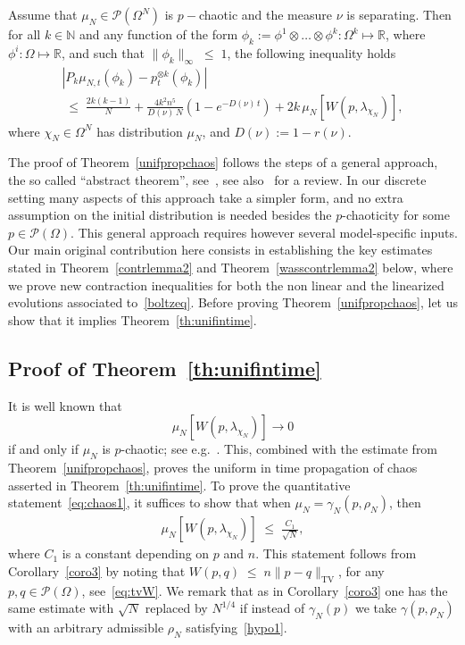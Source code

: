 \documentclass[AHL,Unicode,longabstracts,published]{cedram}
\renewcommand{\leq}{\;\leqslant\;}
\newcommand{\Om}{\Omega}
\newcommand{\tv}{\mathrm{TV}}
\newcommand{\cP}{\mathcal{P}}
\newcommand{\bbN}{\mathbb{N}}
\newcommand{\bbR}{\mathbb{R}}
\let\g=\gamma
\let\r=\rho
\let\O=\Omega
\begin{document}
\begin{theo}\label{unifpropchaos}
Assume that $\mu_{N}\in\cP(\O^N)$ is $p-$chaotic and the measure $\nu$ is separating. Then for all $k \in \bbN$ and any function of the form $\phi_k:= \phi^1\otimes\dots\otimes\phi^k:\O^k\mapsto\bbR$, where $ \phi^i:\Om\mapsto \bbR$, and such that $\|\phi_k\|_{\infty}\leq 1$, the following inequality holds
\begin{multline}\label{propchaosuniftime}
\left|P_k\mu_{N,t}(\phi_k)-p_t^{\otimes k}(\phi_k)\right|\\
\leq \frac{2k(k-1)}{N} + \frac{4k^2n^5}{D(\nu)\,N} \left(1-e^{-D(\nu)\, t}\right) + 2 k\,
\mu_N\left[W\left(p,\lambda_{\chi_N}\right)\right],
\end{multline}
where $\chi_N\in\O^N$ has distribution $\mu_{N}$, and $D(\nu):=1-r(\nu)$.
\end{theo}

The proof of Theorem~\ref{unifpropchaos} follows the steps of a general approach, the so called ``abstract theorem'', see~\cite{grunbaumchaos,kacsprog,anewapp}, see also~\cite{revchaos} for a review. In our discrete setting many aspects of this approach take a simpler form, and no extra assumption on the initial distribution is needed besides the $p$-chaoticity for some $p\in\cP(\O)$. This general approach requires however several model-specific inputs. Our main original contribution here consists in establishing the key estimates stated in Theorem~\ref{contrlemma2} and Theorem~\ref{wasscontrlemma2} below, where we prove new contraction inequalities for both the non linear and the linearized evolutions associated to~\eqref{boltzeq}. Before proving Theorem~\ref{unifpropchaos}, let us show that it implies Theorem~\ref{th:unifintime}.


\subsection{Proof of Theorem~\ref{th:unifintime}}


It is well known that
\[
\mu_N[W(p,\lambda_{\chi_N})] \to 0
\]
if and only if $\mu_{N}$ is $p$-chaotic; see e.g.~\cite[Lemma~3.34]{revchaos}. This, combined with the estimate from Theorem~\ref{unifpropchaos}, proves the uniform in time propagation of chaos asserted in Theorem~\ref{th:unifintime}. To prove the quantitative statement~\eqref{eq:chaos1}, it suffices to show that when $\mu_{N}=\gamma_N(p,\r_N)$, then
\begin{align}\label{eq:empi}
\mu_N\left[W\left(p,\lambda_{\chi_N}\right)\right] \leq \frac{C_1}{\sqrt {N}},
\end{align}
where $C_1$ is a constant depending on $p$ and $n$. This statement follows from Corollary~\ref{coro3} by noting that $W(p,q)\leq n\|p-q\|_{\tv}$, for any $p,q\in\cP(\O)$, see~\eqref{eq:tvW}. We remark that as in Corollary~\ref{coro3} one has the same estimate with $\sqrt N$ replaced by $N^{1/4}$ if instead of $\g_N(p)$ we take $\g(p,\r_N)$ with an arbitrary admissible $\r_N$ satisfying~\eqref{hypo1}.
\end{document}

